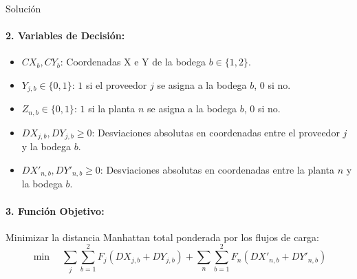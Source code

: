 \documentclass[11pt, a4paper]{article}
\begin{document}
\begin{ejercicio}{Solución}
  \paragraph{2. Variables de Decisión:}
  \begin{itemize}
    \item $CX_b, CY_b$: Coordenadas X e Y de la bodega $b \in \{1, 2\}$.
    \item $Y_{j,b} \in \{0, 1\}$: $1$ si el proveedor $j$ se asigna a la bodega $b$, $0$ si no.
    \item $Z_{n,b} \in \{0, 1\}$: $1$ si la planta $n$ se asigna a la bodega $b$, $0$ si no.
    \item $DX_{j,b}, DY_{j,b} \ge 0$: Desviaciones absolutas en coordenadas entre el proveedor $j$ y la bodega $b$.
    \item $DX'_{n,b}, DY'_{n,b} \ge 0$: Desviaciones absolutas en coordenadas entre la planta $n$ y la bodega $b$.
  \end{itemize}

  \paragraph{3. Función Objetivo:}
  Minimizar la distancia Manhattan total ponderada por los flujos de carga:
  \begin{equation*}
    \min \quad \sum_{j} \sum_{b=1}^{2} F_{j} \left( DX_{j,b} + DY_{j,b} \right) + \sum_{n} \sum_{b=1}^{2} F_{n} \left( DX'_{n,b} + DY'_{n,b} \right)
  \end{equation*}


\end{ejercicio}
\end{document}
